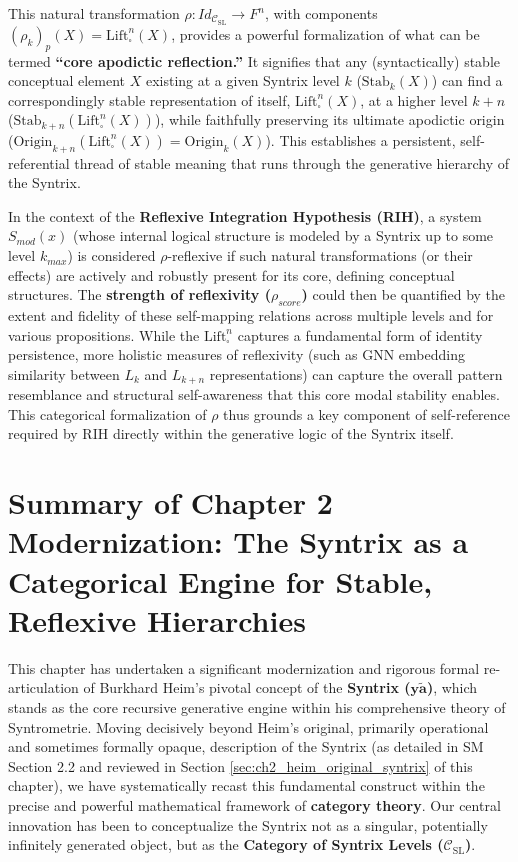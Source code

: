 \documentclass[
    12pt,              %
    a4paper,           %
    headings=normal,   %
    twoside=true,      %
    BCOR=8mm,          %
]{scrbook}
\newcommand{\q}[1]{\enquote{#1}}
\newcommand{\syntrix}{\bm{y\widetilde{a}}}
\newcommand{\BoxSyn}{\square}
\begin{document}
This natural transformation \(\rho: Id_{\mathcal{C}_{\text{SL}}} \to F^n\), with components \((\rho_k)_p(X) = \text{Lift}_\BoxSyn^n(X)\), provides a powerful formalization of what can be termed \textbf{\q{core apodictic reflection.}} It signifies that any (syntactically) stable conceptual element \(X\) existing at a given Syntrix level \(k\) (\(\text{Stab}_k(X)\)) can find a correspondingly stable representation of itself, \(\text{Lift}_\BoxSyn^n(X)\), at a higher level \(k+n\) (\(\text{Stab}_{k+n}(\text{Lift}_\BoxSyn^n(X))\)), while faithfully preserving its ultimate apodictic origin (\(\text{Origin}_{k+n}(\text{Lift}_\BoxSyn^n(X)) = \text{Origin}_k(X)\)). This establishes a persistent, self-referential thread of stable meaning that runs through the generative hierarchy of the Syntrix.

In the context of the \textbf{Reflexive Integration Hypothesis (RIH)}, a system \(S_{mod}(x)\) (whose internal logical structure is modeled by a Syntrix up to some level \(k_{max}\)) is considered \(\rho\)-reflexive if such natural transformations (or their effects) are actively and robustly present for its core, defining conceptual structures. The \textbf{strength of reflexivity (\(\rho_{score}\))} could then be quantified by the extent and fidelity of these self-mapping relations across multiple levels and for various propositions. While the \(\text{Lift}_\BoxSyn^n\) captures a fundamental form of identity persistence, more holistic measures of reflexivity (such as GNN embedding similarity between \(L_k\) and \(L_{k+n}\) representations) can capture the overall pattern resemblance and structural self-awareness that this core modal stability enables. This categorical formalization of \(\rho\) thus grounds a key component of self-reference required by RIH directly within the generative logic of the Syntrix itself.

\section{Summary of Chapter 2 Modernization: The Syntrix as a Categorical Engine for Stable, Reflexive Hierarchies}
\label{sec:ch2_summary_modernization} 

This chapter has undertaken a significant modernization and rigorous formal re-articulation of Burkhard Heim's pivotal concept of the \textbf{Syntrix (\(\syntrix\))}, which stands as the core recursive generative engine within his comprehensive theory of Syntrometrie. Moving decisively beyond Heim's original, primarily operational and sometimes formally opaque, description of the Syntrix (as detailed in SM Section 2.2 and reviewed in Section \ref{sec:ch2_heim_original_syntrix} of this chapter), we have systematically recast this fundamental construct within the precise and powerful mathematical framework of \textbf{category theory}. Our central innovation has been to conceptualize the Syntrix not as a singular, potentially infinitely generated object, but as the \textbf{Category of Syntrix Levels (\(\mathcal{C}_{\text{SL}}\))}.
\end{document}

